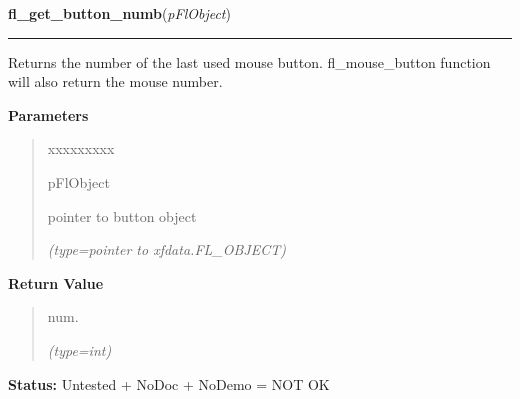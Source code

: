 \hspace{.8\funcindent}\begin{boxedminipage}{\funcwidth}

    \raggedright \textbf{fl\_get\_button\_numb}(\textit{pFlObject})

    \vspace{-1.5ex}

    \rule{\textwidth}{0.5\fboxrule}
\setlength{\parskip}{2ex}
    Returns the number of the last used mouse button. fl\_mouse\_button 
    function will also return the mouse number.

\setlength{\parskip}{1ex}
      \textbf{Parameters}
      \vspace{-1ex}

      \begin{quote}
        \begin{Ventry}{xxxxxxxxx}

          \item[pFlObject]

          pointer to button object

            {\it (type=pointer to xfdata.FL\_OBJECT)}

        \end{Ventry}

      \end{quote}

      \textbf{Return Value}
    \vspace{-1ex}

      \begin{quote}
      num.

      {\it (type=int)}

      \end{quote}

\textbf{Status:} Untested + NoDoc + NoDemo = NOT OK



    \end{boxedminipage}

    \label{xformslib:flbutton:fl_create_generic_button}

    \vspace{0.5ex}

